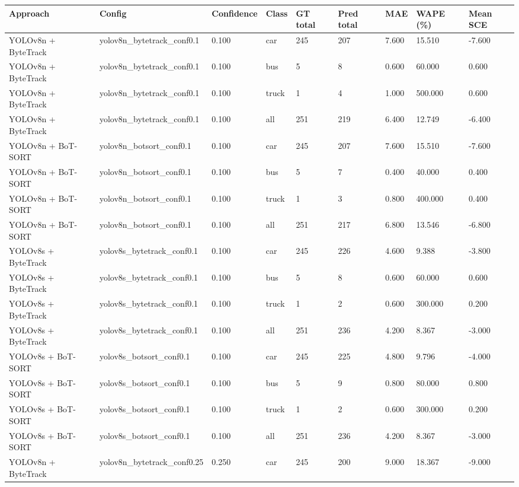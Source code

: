 \begin{tabular}{lllllllll}
\toprule
Approach & Config & Confidence & Class & GT total & Pred total & MAE & WAPE (\%) & Mean SCE \\
\midrule
YOLOv8n + ByteTrack & yolov8n\_bytetrack\_conf0.1 & 0.100 & car & 245 & 207 & 7.600 & 15.510 & -7.600 \\
YOLOv8n + ByteTrack & yolov8n\_bytetrack\_conf0.1 & 0.100 & bus & 5 & 8 & 0.600 & 60.000 & 0.600 \\
YOLOv8n + ByteTrack & yolov8n\_bytetrack\_conf0.1 & 0.100 & truck & 1 & 4 & 1.000 & 500.000 & 0.600 \\
YOLOv8n + ByteTrack & yolov8n\_bytetrack\_conf0.1 & 0.100 & all & 251 & 219 & 6.400 & 12.749 & -6.400 \\
YOLOv8n + BoT-SORT & yolov8n\_botsort\_conf0.1 & 0.100 & car & 245 & 207 & 7.600 & 15.510 & -7.600 \\
YOLOv8n + BoT-SORT & yolov8n\_botsort\_conf0.1 & 0.100 & bus & 5 & 7 & 0.400 & 40.000 & 0.400 \\
YOLOv8n + BoT-SORT & yolov8n\_botsort\_conf0.1 & 0.100 & truck & 1 & 3 & 0.800 & 400.000 & 0.400 \\
YOLOv8n + BoT-SORT & yolov8n\_botsort\_conf0.1 & 0.100 & all & 251 & 217 & 6.800 & 13.546 & -6.800 \\
YOLOv8s + ByteTrack & yolov8s\_bytetrack\_conf0.1 & 0.100 & car & 245 & 226 & 4.600 & 9.388 & -3.800 \\
YOLOv8s + ByteTrack & yolov8s\_bytetrack\_conf0.1 & 0.100 & bus & 5 & 8 & 0.600 & 60.000 & 0.600 \\
YOLOv8s + ByteTrack & yolov8s\_bytetrack\_conf0.1 & 0.100 & truck & 1 & 2 & 0.600 & 300.000 & 0.200 \\
YOLOv8s + ByteTrack & yolov8s\_bytetrack\_conf0.1 & 0.100 & all & 251 & 236 & 4.200 & 8.367 & -3.000 \\
YOLOv8s + BoT-SORT & yolov8s\_botsort\_conf0.1 & 0.100 & car & 245 & 225 & 4.800 & 9.796 & -4.000 \\
YOLOv8s + BoT-SORT & yolov8s\_botsort\_conf0.1 & 0.100 & bus & 5 & 9 & 0.800 & 80.000 & 0.800 \\
YOLOv8s + BoT-SORT & yolov8s\_botsort\_conf0.1 & 0.100 & truck & 1 & 2 & 0.600 & 300.000 & 0.200 \\
YOLOv8s + BoT-SORT & yolov8s\_botsort\_conf0.1 & 0.100 & all & 251 & 236 & 4.200 & 8.367 & -3.000 \\
YOLOv8n + ByteTrack & yolov8n\_bytetrack\_conf0.25 & 0.250 & car & 245 & 200 & 9.000 & 18.367 & -9.000 \\

\end{tabular}
